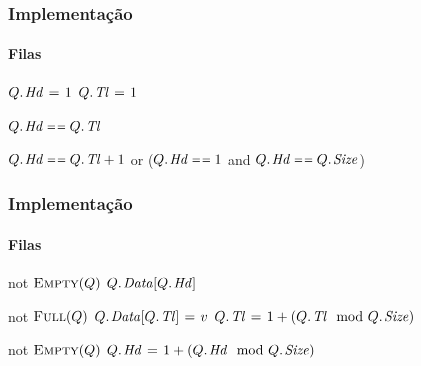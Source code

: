 \documentclass{beamer}
\begin{document}
\begin{frame}

  \frametitle{Implementação}
  \framesubtitle{Filas}

\begin{codebox}
\li $\attrib{Q}{Hd} \gets 1$
\li $\attrib{Q}{Tl} \gets 1$
\end{codebox}
\begin{codebox}
\li  \Return $\attrib{Q}{Hd} \isequal \attrib{Q}{Tl}$
\end{codebox}
\begin{codebox}
\li  \Return $\attrib{Q}{Hd} \isequal \attrib{Q}{Tl} + 1$ or
\li  \> ($\attrib{Q}{Hd} \isequal 1$ and $\attrib{Q}{Hd} \isequal \attrib{Q}{Size}$)
\end{codebox}

\end{frame}

\begin{frame}

  \frametitle{Implementação}
  \framesubtitle{Filas}

\begin{codebox}
\li  \If not $\textnormal{\scshape Empty}(Q)$
\li    \Then \Return $\attrib{Q}{Data}[\attrib{Q}{Hd}]$
     \End
\end{codebox}
\begin{codebox}
\li  \If not $\textnormal{\scshape Full}(Q)$
\li    \Then $\attrib{Q}{Data}[\attrib{Q}{Tl}] \gets v$
\li      $\attrib{Q}{Tl} \gets 1 + (\attrib{Q}{Tl} \mod \attrib{Q}{Size})$
     \End
\end{codebox}
\begin{codebox}
\li  \If not $\textnormal{\scshape Empty}(Q)$
\li    \Then $\attrib{Q}{Hd} \gets 1 + (\attrib{Q}{Hd} \mod \attrib{Q}{Size})$
     \End
\end{codebox}

\end{frame}
\end{document}
